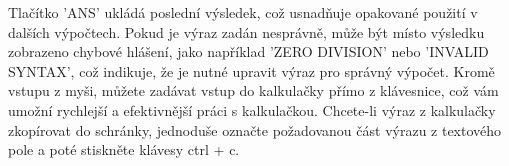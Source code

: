 \documentclass[a4paper, 11pt]{article}
\begin{document}
    Tlačítko 'ANS' ukládá poslední výsledek, což usnadňuje opakované použití v dalších výpočtech. Pokud je výraz zadán nesprávně, může být místo výsledku zobrazeno chybové hlášení, jako například 'ZERO DIVISION' nebo 'INVALID SYNTAX', což indikuje, že je nutné upravit výraz pro správný výpočet. Kromě vstupu z myši, můžete zadávat vstup do kalkulačky přímo z klávesnice, což vám umožní rychlejší a efektivnější práci s kalkulačkou. Chcete-li výraz z kalkulačky zkopírovat do schránky, jednoduše označte požadovanou část výrazu z textového pole a poté stiskněte klávesy ctrl + c.
\end{document}
